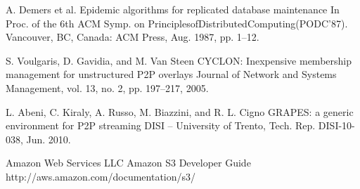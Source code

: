 \begin{thebibliography}{9}

 A. Demers et al.
Epidemic algorithms for replicated database maintenance
In Proc. of the 6th ACM Symp. on PrinciplesofDistributedComputing(PODC’87). Vancouver, BC, Canada: ACM Press, Aug. 1987, pp. 1–12.

 S. Voulgaris, D. Gavidia, and M. Van Steen
CYCLON: Inexpensive membership management for unstructured P2P overlays
Journal of Network and Systems Management, vol. 13, no. 2,
pp. 197–217, 2005.

 L. Abeni, C. Kiraly, A. Russo, M. Biazzini, and R. L. Cigno
GRAPES: a generic environment for P2P streaming
DISI – University of Trento, Tech. Rep. DISI-10-038, Jun. 2010.

 Amazon Web Services LLC
Amazon S3 Developer Guide
http://aws.amazon.com/documentation/s3/



\end{thebibliography}
